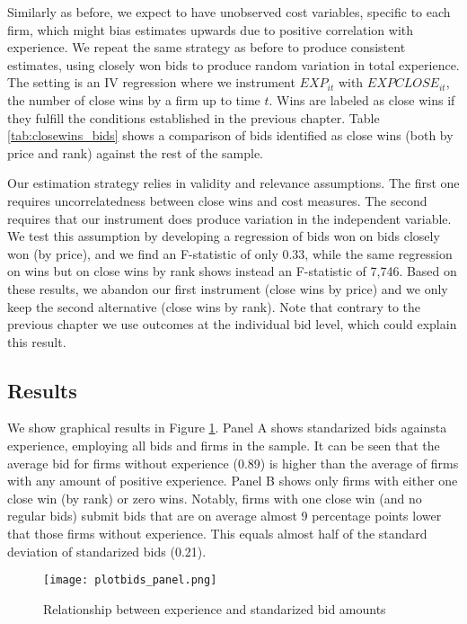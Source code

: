 Similarly as before, we expect to have unobserved cost variables, specific to each firm, which might bias estimates upwards due to positive correlation with experience. We repeat the same strategy as before to produce consistent estimates, using closely won bids to produce random variation in total experience. The setting is an IV regression where we instrument $EXP_{it}$ with $EXPCLOSE_{it}$, the number of close wins by a firm up to time $t$. Wins are labeled as close wins if they fulfill the conditions established in the  previous chapter. Table \ref{tab:closewins_bids} shows a comparison of bids identified as close wins (both by price and rank) against the rest of the sample.

Our estimation strategy relies in validity and relevance assumptions. The first one requires uncorrelatedness between close wins and cost measures. The second requires that our instrument does produce variation in the independent variable. We test this assumption by developing a regression of bids won on bids closely won (by price), and we find  an F-statistic of only 0.33, while the same regression on wins but on close wins by rank shows instead an F-statistic of 7,746. Based on these results, we abandon our first instrument (close wins by price) and we only keep the second alternative (close wins by rank). Note that contrary to the previous chapter we use outcomes at the individual bid level, which could explain this result.



\subsection{Results}
We show graphical results in Figure \ref{fig:plotbids_panel}. Panel A shows standarized bids againsta experience, employing all bids and firms in the sample. It can be seen that the average bid for firms without experience (0.89) is higher than the average of firms with any amount of positive experience. Panel B shows only firms with either one close win (by rank) or zero wins. Notably, firms with one close win (and no regular bids) submit bids that are on average almost 9 percentage points lower that those firms without experience. This equals almost half of the standard deviation of standarized bids (0.21).

\begin{figure}[H]
  \texttt{[image: plotbids\_panel.png]}
  \caption{Relationship between experience and standarized bid amounts}
  \label{fig:plotbids_panel}
\end{figure}

